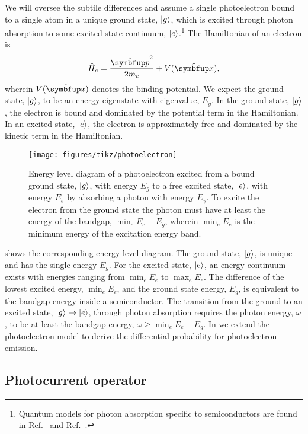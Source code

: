 We will oversee the subtile differences and assume a single photoelectron bound to a single atom in a unique ground state, $\lvert g\rangle$, which is excited through photon absorption to some excited state continuum, $\lvert e\rangle$.\footnote{Quantum models for photon absorption specific to semiconductors are found in Ref.~\cite{Hoyer2002} and Ref.~\cite{Rossi2002}.}
The Hamiltonian of an electron is
\begin{equation}
	\hat{H}_e
	=
	\frac{\vu{p}^2}{2m_e}
	+
	V(\vu{x})
	,
\end{equation}
wherein $V(\vu{x})$ denotes the binding potential.
We expect the ground state, $\lvert g\rangle$, to be an energy eigenstate with eigenvalue, $E_g$.
In the ground state, $\lvert g\rangle$, the electron is bound and dominated by the potential term in the Hamiltonian.
In an excited state, $\lvert e\rangle$, the electron is approximately free and dominated by the kinetic term in the Hamiltonian.
\begin{figure}[htb]
    \centering
    \texttt{[image: figures/tikz/photoelectron]}
    \caption{Energy level diagram of a photoelectron excited from a bound ground state, $\lvert g\rangle$, with energy $E_g$ to a free excited state, $\lvert e\rangle$, with energy $E_e$ by absorbing a photon with energy $E_\gamma$. To excite the electron from the ground state the photon must have at least the energy of the bandgap, $\min_eE_e-E_g$, wherein $\min_eE_e$ is the minimum energy of the excitation energy band.}\label{fig:photoelectron}
\end{figure}
 shows the corresponding energy level diagram.
The ground state, $\lvert g\rangle$, is unique and has the single energy $E_g$.
For the excited state, $\lvert e\rangle$, an energy continuum exists with energies ranging from $\min_eE_e$ to $\max_eE_e$.
The difference of the lowest excited energy, $\min_eE_e$, and the ground state energy, $E_g$, is equivalent to the bandgap energy inside a semiconductor.
The transition from the ground to an excited state, $\lvert g\rangle\to\lvert e\rangle$, through photon absorption requires the photon energy, $\omega$, to be at least the bandgap energy, $\omega\geq\min_eE_e-E_g$.
In  we extend the photoelectron model to derive the differential probability for photoelectron emission.

\FloatBarrier
\subsection{Photocurrent operator}


